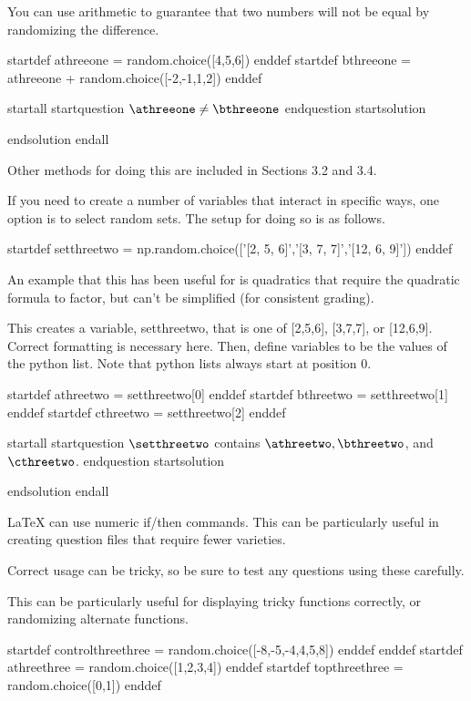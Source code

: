 You can use arithmetic to guarantee that two numbers will not be equal by randomizing the difference.

startdef athreeone = random.choice([4,5,6]) enddef
startdef bthreeone = athreeone + random.choice([-2,-1,1,2]) enddef

startall
startquestion $\athreeone \neq \bthreeone$ endquestion
startsolution \item  endsolution
endall

Other methods for doing this are included in Sections 3.2 and 3.4.




If you need to create a number of variables that interact in specific ways, one option is to select random sets. The setup for doing so is as follows.

startdef setthreetwo = np.random.choice(['[2, 5, 6]','[3, 7, 7]','[12, 6, 9]']) enddef 

An example that this has been useful for is quadratics that require the quadratic formula to factor, but can't be simplified (for consistent grading).

This creates a variable, setthreetwo, that is one of [2,5,6], [3,7,7], or [12,6,9]. Correct formatting is necessary here. Then, define variables to be the values of the python list. Note that python lists always start at position 0.

startdef athreetwo = setthreetwo[0] enddef
startdef bthreetwo = setthreetwo[1] enddef
startdef cthreetwo = setthreetwo[2] enddef

startall
startquestion $\setthreetwo$ contains $\athreetwo,\bthreetwo$, and $\cthreetwo$. endquestion
startsolution \item  endsolution
endall




LaTeX can use numeric if/then commands. This can be particularly useful in creating question files that require fewer varieties. 

Correct usage can be tricky, so be sure to test any questions using these carefully.

This can be particularly useful for displaying tricky functions correctly, or randomizing alternate functions.

startdef controlthreethree = random.choice([-8,-5,-4,4,5,8]) enddef enddef
startdef athreethree = random.choice([1,2,3,4]) enddef
startdef topthreethree = random.choice([0,1]) enddef

